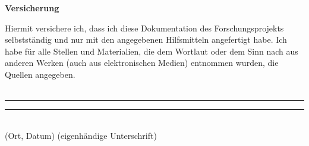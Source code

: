\vspace*{0cm}
\begin{center}
\Large
\textbf{Versicherung}\\
\vspace{1.5cm}
\end{center}
\normalsize
Hiermit versichere ich, dass ich diese Dokumentation des Forschungsprojekts selbstständig und nur mit den angegebenen Hilfsmitteln angefertigt habe.
Ich habe für alle Stellen und Materialien, die dem Wortlaut oder dem Sinn nach aus anderen Werken (auch aus elektronischen Medien) entnommen wurden, die Quellen angegeben.\\
\vspace{3cm}\\
\rule{0.3\textwidth}{0.4pt} \hspace{0.1\textwidth} \rule{0.6\textwidth}{0.4pt}\\
(Ort, Datum) \hspace{0.24\textwidth} (eigenhändige Unterschrift)